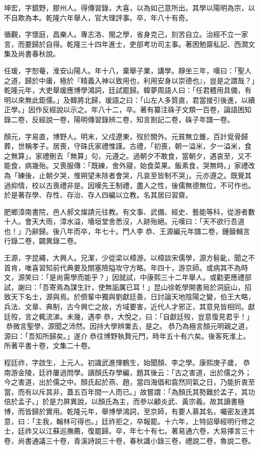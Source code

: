\begin{pinyinscope}
坤宏，字鏡野，膠州人。得傳習錄，大喜，以為如己意所出。其學以陽明為宗，以不自欺為本。乾隆六年舉人，官大理評事。卒，年八十有奇。

循觀，字懷庭，昌樂人。專志洛、閩之學，省身克己，刻苦自立。治經不立一家言，而要歸於自得。乾隆三十四年進士，吏部考功司主事。著困勉齋私記、西澗文集及尚書春秋說。

任瑗，字恕菴，淮安山陽人。年十八，棄舉子業，講學。靜坐三年，嘆曰：「聖人之道，歸於中庸，極於『精義入神以致用也，利用安身以崇德也』，豈是之謂哉？」乾隆元年，大吏舉瑗應博學鴻詞，廷試罷歸。韓夢周語人曰：「任君體用具備，有明以來無此鉅儒。」及韓將北歸，瑗語之曰：「山左人多質直，君當接引後進，以續正學。」因作反經說以示之。年八十二，卒。著有纂注硃子文類一百卷，論語困知錄二卷，反經說一卷，陽明傳習錄辨二卷，知言劄記二卷，硃子年譜一卷。

顏元，字易直，博野人。明末，父戍遼東，歿於關外。元貧無立錐，百計覓骨歸葬，世稱孝子。居喪，守硃氏家禮惟謹。古禮，「初喪，朝一溢米，夕一溢米，食之無算」。家禮刪去「無算」句，元遵之。過朝夕不敢食，當朝夕，遇哀至，又不能食，病幾殆。又喪服傳：「既練，舍外寢，始食菜果。飯素食，哭無時。」家禮改為「練後，止朝夕哭，惟朔望未除者會哭，凡哀至皆制不哭」。元亦遵之。既覺其過抑情，校以古喪禮非是。因嘆先王制禮，盡人之性，後儒無德無位，不可作也。於是著存學、存性、存治、存人四編以立教。名其居曰習齋。

肥鄉漳南書院，邑人郝文燦請元往教。有文事、武備、經史、藝能等科，從游者數十人。會天大雨，漳水溢，墻垣堂舍悉沒，人跡殆絕。元嘆曰：「天不欲行吾道也！」乃辭歸。後八年而卒，年七十。門人李恭、王源編元年譜二卷，鍾錂輯言行錄二卷，闢異錄二卷。

王源，字昆繩，大興人。兄潔，少從梁以樟游。以樟談宋儒學，源方髫齔，聞之不首肯，唯喜習知前代典要及關塞險隘攻守方略。年四十，游京師。或病其不為時文，源笑曰：「是尚需學而能乎？」因就試，中康熙三十二年舉人。或勸更應禮部試，謝曰：「吾寄焉為謀生計，使無詬厲已耳！」昆山徐乾學開書局於洞庭山，招致天下名士，源與焉。於儕輩中獨與劉獻廷善，日討論天地陰陽之變，伯王大略，兵法、文章、典制，古今興亡之故，方域要害，近代人才邪正，其意見皆相同。獻廷歿，言之輒流涕。未幾，遇李恭，大悅之，曰：「自獻廷歿，豈意復見君乎！」恭微言聖學，源聞之沛然。因持大學辨業去，是之。恭乃為極言顏元明親之道，源曰：「吾知所歸矣。」遂介恭往博野執贄元門，時年五十有六矣。後客死淮上。所著平書十卷，文集二十卷。

程廷祚，字啟生，上元人。初識武進惲鶴生，始聞顏、李之學。康熙庚子歲，恭南游金陵，廷祚屢過問學。讀顏氏存學編，題其後云：「古之害道，出於儒之外；今之害道，出於儒之中。顏氏起於燕、趙，當四海倡和翕然同氣之日，乃能折衷至當，而有以斥其非，蓋五百年間一人而已。」故嘗謂：「為顏氏其勢難於孟子，其功倍於孟子。」於是力屏異說，以顏氏為主，而參以顧炎武、黃宗羲。故其讀書極博，而皆歸於實用。乾隆元年，舉博學鴻詞，至京師，有要人慕其名，囑密友達其意，曰：「主我，翰林可得也。」廷祚拒之，卒報罷。十六年，上特詔舉經明行修之士，廷祚又以江蘇巡撫薦，復罷歸。卒，年七十有七。著易通六卷，大易擇言三十卷，尚書通議三十卷，青溪詩說三十卷，春秋識小錄三卷，禮說二卷，魯說二卷。


\end{pinyinscope}

